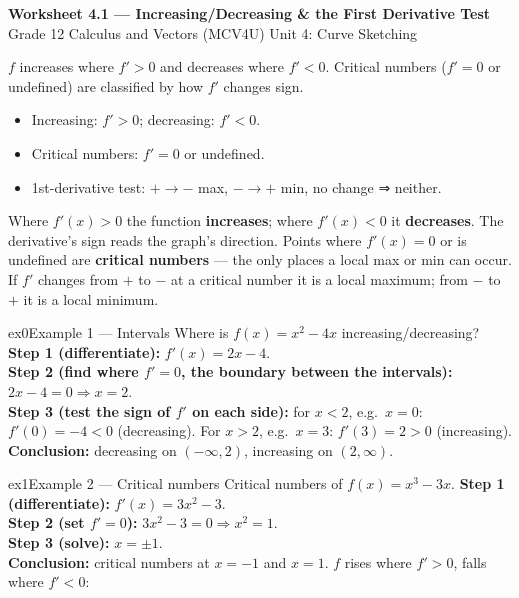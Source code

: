 \documentclass[11pt]{article}
\begin{document}
\begin{center}
{\LARGE\bfseries\color{titleblue}Worksheet 4.1 --- Increasing/Decreasing \& the First Derivative Test}\\[2pt]
{\small Grade 12 Calculus and Vectors (MCV4U) \textperiodcentered{} Unit 4: Curve Sketching}
\end{center}

\begin{ideabox}
$f$ increases where $f'>0$ and decreases where $f'<0$. Critical numbers ($f'=0$ or undefined) are classified by how $f'$ changes sign.
\begin{itemize}[leftmargin=*,itemsep=2pt]
  \item Increasing: $f'>0$; decreasing: $f'<0$.
  \item Critical numbers: $f'=0$ or undefined.
  \item 1st-derivative test: $+\to-$ max, $-\to+$ min, no change ⇒ neither.
\end{itemize}
\end{ideabox}

\begin{learnbox}
Where $f'(x)>0$ the function \textbf{increases}; where $f'(x)<0$ it \textbf{decreases}. The derivative's sign reads the graph's direction.
Points where $f'(x)=0$ or is undefined are \textbf{critical numbers} — the only places a local max or min can occur.
If $f'$ changes from $+$ to $-$ at a critical number it is a local maximum; from $-$ to $+$ it is a local minimum.
\end{learnbox}


\begin{example}{ex0}{Example 1 --- Intervals}
Where is $f(x)=x^2-4x$ increasing/decreasing?\soln
\textbf{Step 1 (differentiate):} $f'(x)=2x-4$.\\[3pt]
\textbf{Step 2 (find where $f'=0$, the boundary between the intervals):} $2x-4=0\Rightarrow x=2$.\\[3pt]
\textbf{Step 3 (test the sign of $f'$ on each side):} for $x<2$, e.g.\ $x=0$: $f'(0)=-4<0$ (decreasing). For $x>2$, e.g.\ $x=3$: $f'(3)=2>0$ (increasing).\\[3pt]
\textbf{Conclusion:} decreasing on $(-\infty,2)$, increasing on $(2,\infty)$.
\end{example}

\begin{example}{ex1}{Example 2 --- Critical numbers}
Critical numbers of $f(x)=x^3-3x$.\soln
\textbf{Step 1 (differentiate):} $f'(x)=3x^2-3$.\\[3pt]
\textbf{Step 2 (set $f'=0$):} $3x^2-3=0\Rightarrow x^2=1$.\\[3pt]
\textbf{Step 3 (solve):} $x=\pm1$.\\[3pt]
\textbf{Conclusion:} critical numbers at $x=-1$ and $x=1$. $f$ rises where $f'>0$, falls where $f'<0$:
\end{example}
\end{document}
